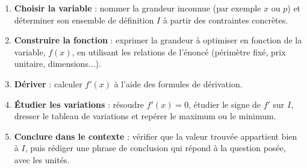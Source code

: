 \documentclass[11pt]{article}
\begin{document}
\begin{methode}
\begin{enumerate}
\item \textbf{Choisir la variable} : nommer la grandeur inconnue (par exemple $x$ ou $p$) et déterminer son ensemble de définition $I$ à partir des contraintes concrètes.
\item \textbf{Construire la fonction} : exprimer la grandeur à optimiser en fonction de la variable, $f(x)$, en utilisant les relations de l'énoncé (périmètre fixé, prix unitaire, dimensions...).
\item \textbf{Dériver} : calculer $f'(x)$ à l'aide des formules de dérivation.
\item \textbf{Étudier les variations} : résoudre $f'(x) = 0$, étudier le signe de $f'$ sur $I$, dresser le tableau de variations et repérer le maximum ou le minimum.
\item \textbf{Conclure dans le contexte} : vérifier que la valeur trouvée appartient bien à $I$, puis rédiger une phrase de conclusion qui répond à la question posée, avec les unités.
\end{enumerate}
\end{methode}
\end{document}
